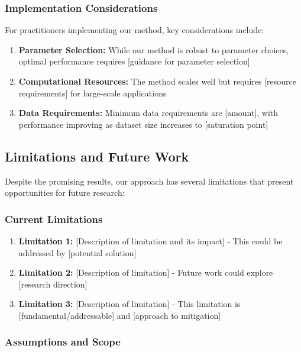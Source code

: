 \subsubsection{Implementation Considerations}

For practitioners implementing our method, key considerations include:
\begin{enumerate}
    \item \textbf{Parameter Selection:} While our method is robust to parameter choices, optimal performance requires [guidance for parameter selection]
    
    \item \textbf{Computational Resources:} The method scales well but requires [resource requirements] for large-scale applications
    
    \item \textbf{Data Requirements:} Minimum data requirements are [amount], with performance improving as dataset size increases to [saturation point]
\end{enumerate}

\subsection{Limitations and Future Work}
\label{subsec:limitations}

Despite the promising results, our approach has several limitations that present opportunities for future research:

\subsubsection{Current Limitations}

\begin{enumerate}
    \item \textbf{Limitation 1:} [Description of limitation and its impact] - This could be addressed by [potential solution]
    
    \item \textbf{Limitation 2:} [Description of limitation] - Future work could explore [research direction]
    
    \item \textbf{Limitation 3:} [Description of limitation] - This limitation is [fundamental/addressable] and [approach to mitigation]
\end{enumerate}

\subsubsection{Assumptions and Scope}

